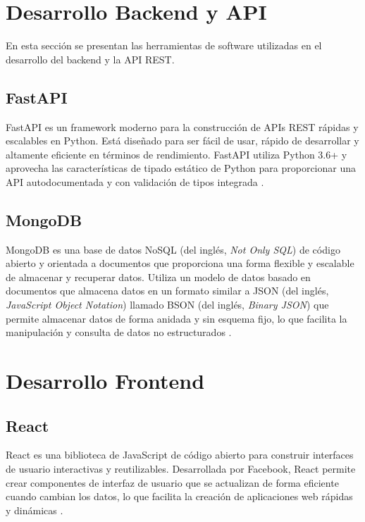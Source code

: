 \section{Desarrollo Backend y API}

En esta sección se presentan las herramientas de software utilizadas en el
desarrollo del backend y la API REST.

\subsection{FastAPI}

FastAPI es un framework moderno para la construcción de APIs REST rápidas y
escalables en Python. Está diseñado para ser fácil de usar, rápido de
desarrollar y altamente eficiente en términos de rendimiento. FastAPI utiliza
Python 3.6+ y aprovecha las características de tipado estático de Python para
proporcionar una API autodocumentada y con validación de tipos integrada
\cite{FastAPI}.

\subsection{MongoDB}

MongoDB es una base de datos NoSQL (del inglés, \textit{Not Only SQL}) de código abierto y
orientada a documentos que proporciona una forma flexible y escalable de
almacenar y recuperar datos. Utiliza un modelo de datos basado en documentos
que almacena datos en un formato similar a JSON (del inglés, \textit{JavaScript Object Notation}) llamado BSON (del inglés, \textit{Binary JSON}) que permite almacenar datos
de forma anidada y sin esquema fijo, lo que facilita la manipulación y consulta
de datos no estructurados \cite{MongoDB}.

\section{Desarrollo Frontend}

\subsection{React}

React es una biblioteca de JavaScript de código abierto para construir
interfaces de usuario interactivas y reutilizables. Desarrollada por Facebook,
React permite crear componentes de interfaz de usuario que se actualizan de
forma eficiente cuando cambian los datos, lo que facilita la creación de
aplicaciones web rápidas y dinámicas \cite{React}.

